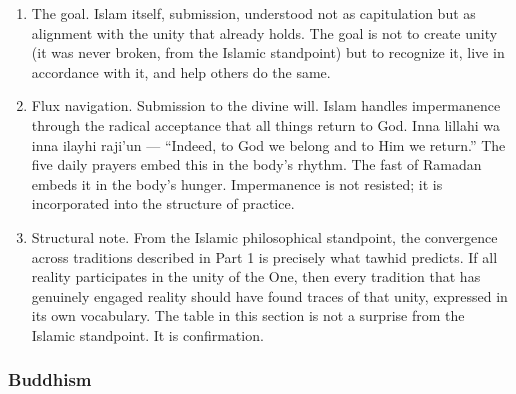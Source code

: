 \documentclass[
]{article}
\begin{document}
\begin{enumerate}
  authority) of the Imams provides a living interpretive chain that
  keeps the tradition's intellectual life connected to its source. In
  the language of this framework, the Shia intellectual tradition is an
  explicit claim that the \(\mathcal{R}_{\alpha\beta}\) maps are
  recoverable through aql, that the coordination layer between the
  particular and the universal was never truly lost, only obscured by
  forgetfulness.
\item
  The goal. Islam itself, submission, understood not as capitulation but
  as alignment with the unity that already holds. The goal is not to
  create unity (it was never broken, from the Islamic standpoint) but to
  recognize it, live in accordance with it, and help others do the same.
\item
  Flux navigation. Submission to the divine will. Islam handles
  impermanence through the radical acceptance that all things return to
  God. Inna lillahi wa inna ilayhi raji'un --- ``Indeed, to God we
  belong and to Him we return.'' The five daily prayers embed this in
  the body's rhythm. The fast of Ramadan embeds it in the body's hunger.
  Impermanence is not resisted; it is incorporated into the structure of
  practice.
\item
  Structural note. From the Islamic philosophical standpoint, the
  convergence across traditions described in Part 1 is precisely what
  tawhid predicts. If all reality participates in the unity of the One,
  then every tradition that has genuinely engaged reality should have
  found traces of that unity, expressed in its own vocabulary. The table
  in this section is not a surprise from the Islamic standpoint. It is
  confirmation.
\end{enumerate}

\subsubsection{Buddhism}\label{buddhism}
\end{document}
